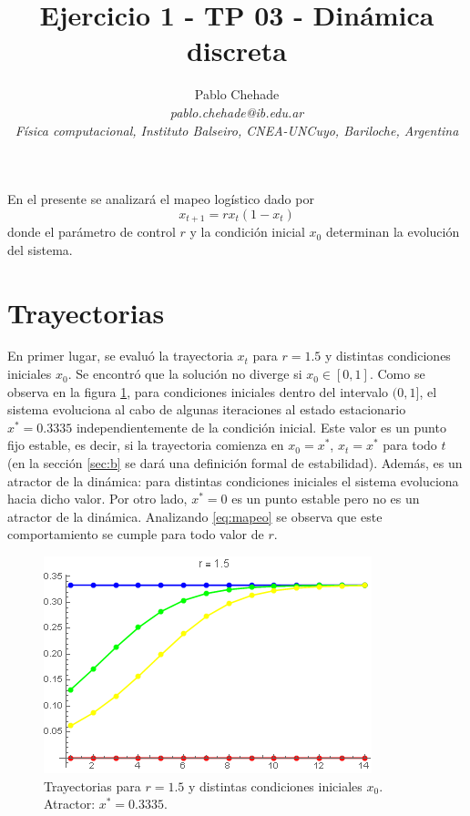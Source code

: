 \documentclass[aps,prb,twocolumn,superscriptaddress,floatfix,longbibliography]{revtex4-2}
\newcounter{para}
\begin{document}
\newcommand{\mytitle}{Ejercicio 1 - TP 03 - Dinámica discreta }

\title{\mytitle}

\author{Pablo Chehade \\
    \small \textit{pablo.chehade@ib.edu.ar} \\
    \small \textit{Física computacional, Instituto Balseiro, CNEA-UNCuyo, Bariloche, Argentina} \\}


\maketitle

En el presente se analizará el mapeo logístico dado por
\begin{equation}
x_{t+1} = r x_t (1-x_t)
\label{eq:mapeo}
\end{equation}
donde el parámetro de control $r$ y la condición inicial $x_0$ determinan la evolución del sistema.


\section{\label{sec:a}Trayectorias}

En primer lugar, se evaluó la trayectoria $x_t$ para $r = 1.5$ y distintas condiciones iniciales $x_0$. Se encontró que la solución no diverge si $x_0 \in [0,1]$. Como se observa en la figura \ref{fig:a.r_1.5}, para condiciones iniciales dentro del intervalo $(0,1]$, el sistema evoluciona al cabo de algunas iteraciones al estado estacionario $x^* =  0.3335$ independientemente de la condición inicial. Este valor es un punto fijo estable, es decir, si la trayectoria comienza en $x_0 = x^*$, $x_t = x^*$ para todo $t$ (en la sección \ref{sec:b} se dará una definición formal de estabilidad). Además, es un atractor de la dinámica: para distintas condiciones iniciales el sistema evoluciona hacia dicho valor. Por otro lado, $x^* = 0$ es un punto estable pero no es un atractor de la dinámica. Analizando \ref{eq:mapeo} se observa que este comportamiento se cumple para todo valor de $r$.

\begin{figure}[htp]
    \includegraphics[clip=true,width=0.7\columnwidth]{a.r_1.5.png}
    \caption{Trayectorias para $r = 1.5$ y distintas condiciones iniciales $x_0$. Atractor: $x^* = 0.3335$.}
     \label{fig:a.r_1.5}
\end{figure}
\end{document}
